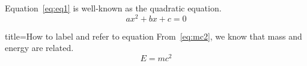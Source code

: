 \documentclass[../geometrymemo.tex]{subfiles}
\begin{document}
Equation~\eqref{eq:eq1} is well-known as the quadratic equation.
\begin{equation}\label{eq:eq1}
    ax^2+bx+c = 0
\end{equation}

\begin{tcblisting}{title=How to label and refer to equation}
    From~\eqref{eq:mc2}, we know that mass and energy are related.
    \begin{equation}\label{eq:mc2}
        E = mc^2
    \end{equation}
\end{tcblisting}
\end{document}

